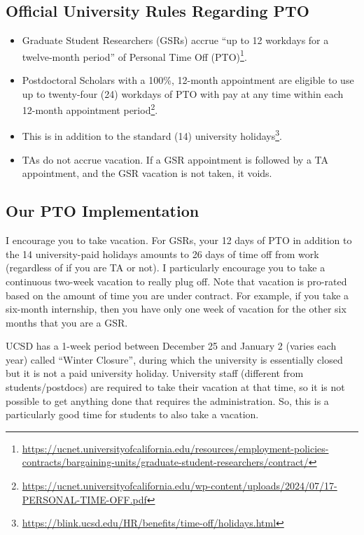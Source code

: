 \documentclass[12pt]{article}
\begin{document}
\subsection{Official University Rules Regarding PTO}
\begin{itemize}

  \item Graduate Student Researchers (GSRs) accrue ``up to 12 workdays for a twelve-month period'' of Personal Time Off (PTO)\footnote{\url{https://ucnet.universityofcalifornia.edu/resources/employment-policies-contracts/bargaining-units/graduate-student-researchers/contract/}}.
  \item Postdoctoral Scholars with a 100\%, 12-month appointment are eligible to use up to twenty-four (24) workdays of PTO with pay at any time within each 12-month appointment period\footnote{\url{https://ucnet.universityofcalifornia.edu/wp-content/uploads/2024/07/17-PERSONAL-TIME-OFF.pdf}}.
  \item This is in addition to the standard (14) university holidays\footnote{\url{https://blink.ucsd.edu/HR/benefits/time-off/holidays.html}}.
  \item TAs do not accrue vacation.
        If a GSR appointment is followed by a TA appointment, and the GSR vacation is not taken, it voids.
\end{itemize}

\subsection{Our PTO Implementation}

I encourage you to take vacation.
For GSRs, your 12 days of PTO in addition to the 14 university-paid holidays amounts to 26 days of time off from work (regardless of if you are TA or not).
I particularly encourage you to take a continuous two-week vacation to really plug off.
Note that vacation is pro-rated based on the amount of time you are under contract.
For example, if you take a six-month internship, then you have only one week of vacation for the other six months that you are a GSR.

UCSD has a 1-week period between December 25 and January 2 (varies each year) called ``Winter Closure'', during which the university is essentially closed but it is not a paid university holiday.
University staff (different from students/postdocs) are required to take their vacation at that time, so it is not possible to get anything done that requires the administration.
So, this is a particularly good time for students to also take a vacation.
\end{document}
